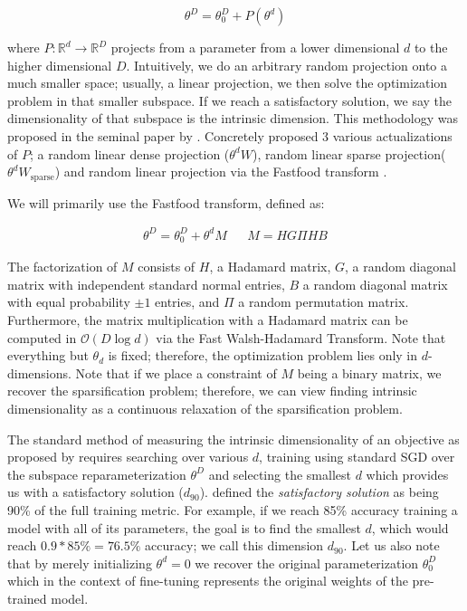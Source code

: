 \begin{equation}
    \theta^{D} = \theta^{D}_0 + P(\theta^{d})
    \label{eq:subspace_def}
\end{equation}

where $P: \mathbb{R}^d \rightarrow \mathbb{R}^D$ projects from a parameter from a lower dimensional $d$ to the higher dimensional $D$. Intuitively, we do an arbitrary random projection onto a much smaller space; usually, a linear projection, we then solve the optimization problem in that smaller subspace. If we reach a satisfactory solution, we say the dimensionality of that subspace is the intrinsic dimension. This methodology was proposed in the seminal paper by \cite{intrinsic_dimension}. Concretely \cite{intrinsic_dimension} proposed 3 various actualizations of $P$; a random linear dense projection ($\theta^{d}W$), random linear sparse projection($\theta^{d}W_{\text{sparse}}$) and random linear projection via the Fastfood transform \citep{fastfood}.

We will primarily use the Fastfood transform, defined as:

\begin{align}
    \theta^{D} = \theta^{D}_0 + \theta^{d}M && M=HG\Pi HB \label{eq:did}
\end{align}

The factorization of $M$ consists of $H$, a Hadamard matrix, $G$, a random diagonal matrix with independent standard normal entries, $B$ a random diagonal matrix with equal probability $\pm 1$ entries, and $\Pi$ a random permutation matrix. Furthermore, the matrix multiplication with a Hadamard matrix can be computed in $\mathcal{O}(D \log{d})$ via the Fast Walsh-Hadamard Transform. Note that everything but $\theta_d$ is fixed; therefore, the optimization problem lies only in $d$-dimensions. Note that if we place a constraint of $M$ being a binary matrix, we recover the sparsification problem; therefore, we can view finding intrinsic dimensionality as a continuous relaxation of the sparsification problem. 

The standard method of measuring the intrinsic dimensionality of an objective as proposed by \cite{intrinsic_dimension} requires searching over various $d$, training using standard SGD over the subspace reparameterization $\theta^{D}$ and selecting the smallest $d$ which provides us with a satisfactory solution ($d_{90}$). \cite{intrinsic_dimension} defined the \textit{satisfactory solution} as being 90\% of the full training metric. For example, if we reach 85\% accuracy training a model with all of its parameters, the goal is to find the smallest $d$, which would reach $0.9 * 85\% = 76.5\%$ accuracy; we call this dimension $d_{90}$. Let us also note that by merely initializing $\theta^d = 0$ we recover the original parameterization $\theta^{D}_0$ which in the context of fine-tuning represents the original weights of the pre-trained model.

